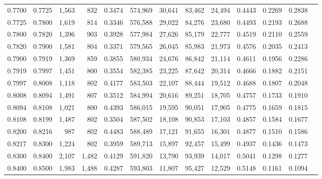 \begin{tabular}{rrrrrrrrrrrrr}
0.7700 & 0.7725 &  1,563 &   832 &                                     0.3474 & 574,969 &  30,641 &  83,462 &  24,494 & 0.4443 & 0.2269 & 0.2838 \\
0.7725 & 0.7800 &  1,619 &   814 &                                     0.3346 & 576,588 &  29,022 &  84,276 &  23,680 & 0.4493 & 0.2193 & 0.2688 \\
0.7800 & 0.7820 &  1,396 &   903 &                                     0.3928 & 577,984 &  27,626 &  85,179 &  22,777 & 0.4519 & 0.2110 & 0.2559 \\
0.7820 & 0.7900 &  1,581 &   804 &                                     0.3371 & 579,565 &  26,045 &  85,983 &  21,973 & 0.4576 & 0.2035 & 0.2413 \\
0.7900 & 0.7919 &  1,369 &   859 &                                     0.3855 & 580,934 &  24,676 &  86,842 &  21,114 & 0.4611 & 0.1956 & 0.2286 \\
0.7919 & 0.7997 &  1,451 &   800 &                                     0.3554 & 582,385 &  23,225 &  87,642 &  20,314 & 0.4666 & 0.1882 & 0.2151 \\
0.7997 & 0.8008 &  1,118 &   802 &                                     0.4177 & 583,503 &  22,107 &  88,444 &  19,512 & 0.4688 & 0.1807 & 0.2048 \\
0.8008 & 0.8094 &  1,491 &   807 &                                     0.3512 & 584,994 &  20,616 &  89,251 &  18,705 & 0.4757 & 0.1733 & 0.1910 \\
0.8094 & 0.8108 &  1,021 &   800 &                                     0.4393 & 586,015 &  19,595 &  90,051 &  17,905 & 0.4775 & 0.1659 & 0.1815 \\
0.8108 & 0.8199 &  1,487 &   802 &                                     0.3504 & 587,502 &  18,108 &  90,853 &  17,103 & 0.4857 & 0.1584 & 0.1677 \\
0.8200 & 0.8216 &    987 &   802 &                                     0.4483 & 588,489 &  17,121 &  91,655 &  16,301 & 0.4877 & 0.1510 & 0.1586 \\
0.8217 & 0.8300 &  1,224 &   802 &                                     0.3959 & 589,713 &  15,897 &  92,457 &  15,499 & 0.4937 & 0.1436 & 0.1473 \\
0.8300 & 0.8400 &  2,107 & 1,482 &                                     0.4129 & 591,820 &  13,790 &  93,939 &  14,017 & 0.5041 & 0.1298 & 0.1277 \\
0.8400 & 0.8500 &  1,983 & 1,488 &                                     0.4287 & 593,803 &  11,807 &  95,427 &  12,529 & 0.5148 & 0.1161 & 0.1094 \\

\end{tabular}
